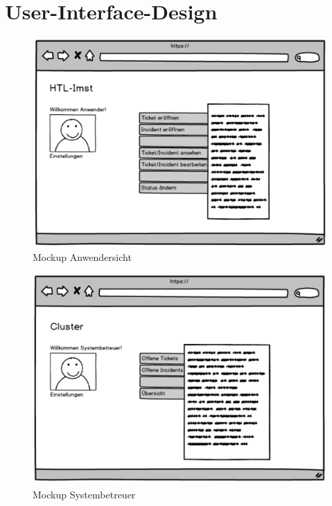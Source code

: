\newpage
\section{User-Interface-Design}	
\begin{figure}[h]
	\centering
	\includegraphics[scale=0.44]{figures/Wireframe_Anwender.png}
	\caption{Mockup Anwendersicht}
	\label{Abb_Mockup_Anwendersicht}
\end{figure}

\vspace{-.5cm}
\begin{figure}[h]
	\centering
	\includegraphics[scale=0.399]{figures/Wireframe_Systembetreuer.png}
	\caption{Mockup Systembetreuer}
	\label{Abb_Mockup_Systembetreuer}
\end{figure}



